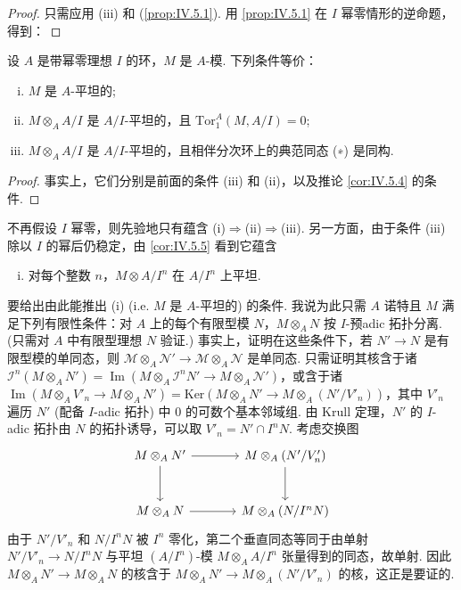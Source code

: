 \begin{proof}
只需应用 (iii) 和 (\cref{prop:IV.5.1}). 用 \ref{prop:IV.5.1} 在 $I$ 幂零情形的逆命题，得到：
\end{proof}

\begin{corollary}\label{cor:IV.5.5}
设 $A$ 是带幂零理想 $I$ 的环，$M$ 是 $A$-模. 下列条件等价：
\begin{enumerate}[(i)]
\item $M$ 是 $A$-平坦的; 
\item $M \otimes_A A/I$ 是 $A/I$-平坦的，且 $\mathrm{Tor}_{1}^{A}(M, A/I) = 0$; 
\item $M \otimes_A A/I$ 是 $A/I$-平坦的，且相伴分次环上的典范同态 (∗) 是同构.
\end{enumerate}
\end{corollary}

\begin{proof}
事实上，它们分别是前面的条件 (iii) 和 (ii)，以及推论 \ref{cor:IV.5.4} 的条件.
\end{proof}

不再假设 $I$ 幂零，则先验地只有蕴含 (i)$\Rightarrow$(ii)$\Rightarrow$(iii). 另一方面，由于条件 (iii) 除以 $I$ 的幂后仍稳定，由 \ref{cor:IV.5.5} 看到它蕴含
\begin{enumerate}[(i)]
\item[((iv))] 对每个整数 $n$，$M \otimes A/I^n$ 在 $A/I^n$ 上平坦.
\end{enumerate}
要给出由此能推出 (i) (i.e. $M$ 是 $A$-平坦的) 的条件. 我说为此只需 $A$ 诺特且 $M$ 满足下列有限性条件：对 $A$ 上的每个有限型模 $N$，$M \otimes_A N$ 按 $I$-预adic 拓扑分离. (只需对 $A$ 中有限型理想 $N$ 验证.) 事实上，证明在这些条件下，若 $N' \to N$ 是有限型模的单同态，则 $\mathcal{M} \otimes_A \mathcal{N}' \to \mathcal{M} \otimes_A \mathcal{N}$ 是单同态. 只需证明其核含于诸 $\mathcal{I}^n(M \otimes_A N') = \operatorname{Im}(M \otimes_A \mathcal{I}^n N' \to M \otimes_A \mathcal{N}')$，或含于诸 $\operatorname{Im}(M \otimes_A V'_n \to M \otimes_A N') = \mathrm{Ker}(M \otimes_A N' \to M \otimes_A (N'/V'_n))$，其中 $V'_n$ 遍历 $N'$ (配备 $I$-adic 拓扑) 中 0 的可数个基本邻域组. 由 Krull 定理，$N'$ 的 $I$-adic 拓扑由 $N$ 的拓扑诱导，可以取 $V'_n = N' \cap I^n N$. 考虑交换图
\[
\begin{tikzcd}[row sep=large, column sep=large]
M \otimes_A N' \arrow[r] \arrow[d] & M \otimes_A (N'/V'_n) \arrow[d] \\
M \otimes_A N \arrow[r] & M \otimes_A (N/I^n N)
\end{tikzcd}
\]
由于 $N'/V'_n$ 和 $N/I^n N$ 被 $I^n$ 零化，第二个垂直同态等同于由单射 $N'/V'_n \to N/I^n N$ 与平坦 $(A/I^n)$-模 $M \otimes_A A/I^n$ 张量得到的同态，故单射. 因此 $M \otimes_A N' \to M \otimes_A N$ 的核含于 $M \otimes_A N' \to M \otimes_A (N'/V'_n)$ 的核，这正是要证的.

